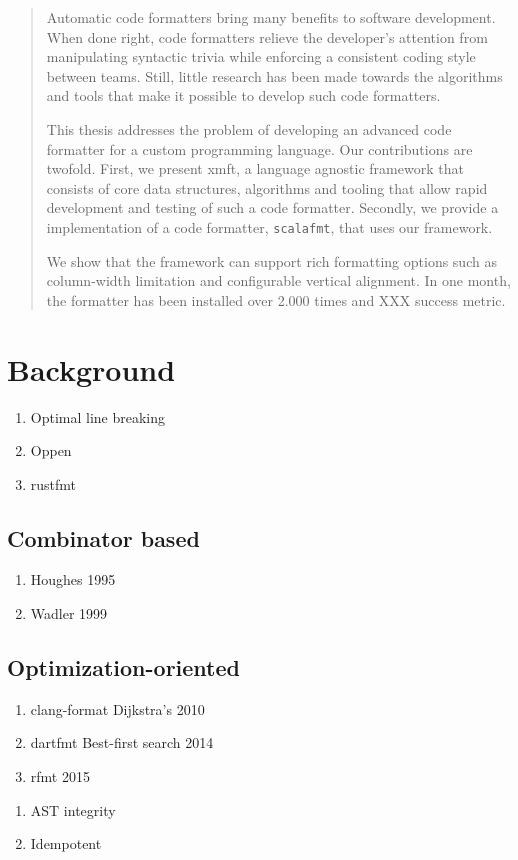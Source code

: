 \documentclass[11pt,a4paper]{article}
\begin{document}



\begin{abstract}
  Automatic code formatters bring many benefits to software development.
  When done right, code formatters relieve the developer's attention from manipulating
  syntactic trivia while enforcing a consistent coding style between teams.
  Still, little research has been made towards the algorithms and tools that make it possible to develop such code formatters.

  This thesis addresses the problem of developing an advanced code formatter for a custom programming language.
  Our contributions are twofold.
  First, we present xmft, a language agnostic framework that consists of core data structures, algorithms and tooling 
  that allow rapid development and testing of such a code formatter.
  Secondly, we provide a implementation of a code formatter, \texttt{scalafmt}, that uses our framework.

  We show that the framework can support rich formatting options such as
  column-width limitation and configurable vertical alignment.
  In one month, the formatter has been installed over 2.000 times and XXX success metric.
\end{abstract}
\tableofcontents

\section{Background}
\begin{enumerate}
  \item Optimal line breaking
  \item Oppen
  \item rustfmt
\end{enumerate}
\subsection{Combinator based}
\begin{enumerate}
  \item Houghes 1995
  \item Wadler 1999
\end{enumerate}
\subsection{Optimization-oriented}
\begin{enumerate}
  \item clang-format Dijkstra's 2010
  \item dartfmt Best-first search 2014
  \item rfmt 2015
\end{enumerate}
\begin{enumerate}
  \item AST integrity
  \item Idempotent
\end{enumerate}
\end{document}
